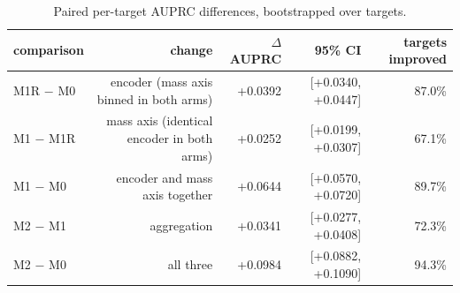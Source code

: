 \begin{table}[htbp]
\centering
\caption{Paired per-target AUPRC differences, bootstrapped over targets.}
\label{tab:table3_paired_differences}
\begin{tabular}{l r r r r}
\toprule
comparison & change & $\Delta$ AUPRC & 95\% CI & targets improved \\
\midrule
M1R $-$ M0 & encoder (mass axis binned in both arms) & +0.0392 & [+0.0340, +0.0447] & 87.0\% \\
M1 $-$ M1R & mass axis (identical encoder in both arms) & +0.0252 & [+0.0199, +0.0307] & 67.1\% \\
M1 $-$ M0 & encoder and mass axis together & +0.0644 & [+0.0570, +0.0720] & 89.7\% \\
M2 $-$ M1 & aggregation & +0.0341 & [+0.0277, +0.0408] & 72.3\% \\
M2 $-$ M0 & all three & +0.0984 & [+0.0882, +0.1090] & 94.3\% \\
\bottomrule
\end{tabular}
\end{table}
